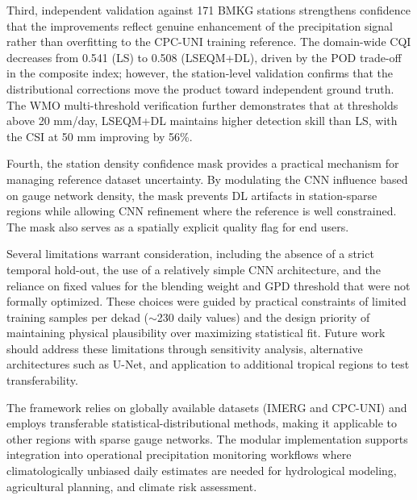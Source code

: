\documentclass[11pt,a4paper]{article}
\begin{document}
Third, independent validation against 171 BMKG stations strengthens
confidence that the improvements reflect genuine enhancement of the
precipitation signal rather than overfitting to the CPC-UNI training
reference. The domain-wide CQI decreases from 0.541 (LS) to 0.508
(LSEQM+DL), driven by the POD trade-off in the composite index; however,
the station-level validation confirms that the distributional
corrections move the product toward independent ground truth. The WMO
multi-threshold verification further demonstrates that at thresholds
above 20 mm/day, LSEQM+DL maintains higher detection skill than LS, with
the CSI at 50 mm improving by 56\%.

Fourth, the station density confidence mask provides a practical
mechanism for managing reference dataset uncertainty. By modulating the
CNN influence based on gauge network density, the mask prevents DL
artifacts in station-sparse regions while allowing CNN refinement where
the reference is well constrained. The mask also serves as a spatially
explicit quality flag for end users.

Several limitations warrant consideration, including the absence of a
strict temporal hold-out, the use of a relatively simple CNN
architecture, and the reliance on fixed values for the blending weight
and GPD threshold that were not formally optimized. These choices were
guided by practical constraints of limited training samples per dekad
($\sim$230 daily values) and the design priority of maintaining
physical plausibility over maximizing statistical fit. Future work
should address these limitations through sensitivity analysis,
alternative architectures such as U-Net, and application to additional
tropical regions to test transferability.

The framework relies on globally available datasets (IMERG and CPC-UNI)
and employs transferable statistical-distributional methods, making it
applicable to other regions with sparse gauge networks. The modular
implementation supports integration into operational precipitation
monitoring workflows where climatologically unbiased daily estimates are
needed for hydrological modeling, agricultural planning, and climate
risk assessment.

\end{document}
